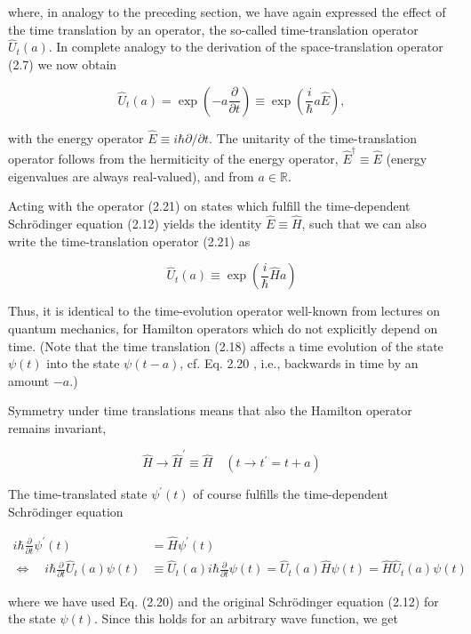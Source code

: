 \documentclass[10pt, letterpaper]{article}
\begin{document}
where, in analogy to the preceding section, we have again expressed the effect of the time translation by an operator, the so-called time-translation operator $\hat{U}_{t}(a)$. In complete analogy to the derivation of the space-translation operator (2.7) we now obtain

$$
\hat{U}_{t}(a)=\exp \left(-a \frac{\partial}{\partial t}\right) \equiv \exp \left(\frac{i}{\hbar} a \hat{E}\right),
$$

with the energy operator $\hat{E} \equiv i \hbar \partial / \partial t$. The unitarity of the time-translation operator follows from the hermiticity of the energy operator, $\hat{E}^{\dagger} \equiv \hat{E}$ (energy eigenvalues are always real-valued), and from $a \in \mathbb{R}$.

Acting with the operator (2.21) on states which fulfill the time-dependent Schrödinger equation (2.12) yields the identity $\hat{E} \equiv \hat{H}$, such that we can also write the time-translation operator (2.21) as

$$
\hat{U}_{t}(a) \equiv \exp \left(\frac{i}{\hbar} \hat{H} a\right)
$$

Thus, it is identical to the time-evolution operator well-known from lectures on quantum mechanics, for Hamilton operators which do not explicitly depend on time. (Note that the time translation (2.18) affects a time evolution of the state $\psi(t)$ into the state $\psi(t-a)$, cf. Eq. 2.20 , i.e., backwards in time by an amount $-a$.)

Symmetry under time translations means that also the Hamilton operator remains invariant,

$$
\hat{H} \longrightarrow \hat{H}^{\prime} \equiv \hat{H} \quad\left(t \longrightarrow t^{\prime}=t+a\right)
$$

The time-translated state $\psi^{\prime}(t)$ of course fulfills the time-dependent Schrödinger equation

$$
\begin{aligned}
i \hbar \frac{\partial}{\partial t} \psi^{\prime}(t) & =\hat{H} \psi^{\prime}(t) \\
\Longleftrightarrow \quad i \hbar \frac{\partial}{\partial t} \hat{U}_{t}(a) \psi(t) & \equiv \hat{U}_{t}(a) i \hbar \frac{\partial}{\partial t} \psi(t)=\hat{U}_{t}(a) \hat{H} \psi(t)=\hat{H} \hat{U}_{t}(a) \psi(t)
\end{aligned}
$$

where we have used Eq. (2.20) and the original Schrödinger equation (2.12) for the state $\psi(t)$. Since this holds for an arbitrary wave function, we get
\end{document}
